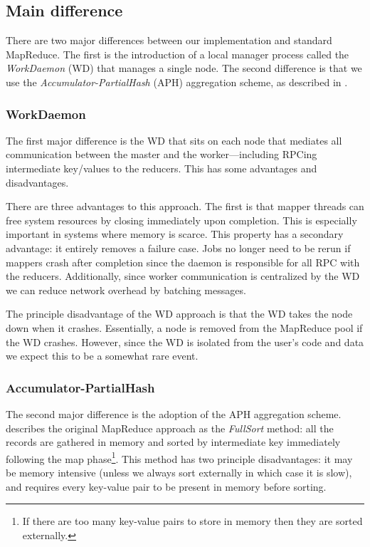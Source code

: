 \documentclass[10pt,letter,final,article,twocolumn]{article} %
\begin{document}
\subsection{Main difference}

There are two major differences between our implementation and standard MapReduce. The first is the introduction of a local manager process called the \emph{WorkDaemon} (WD) that manages a single node. The second difference is that we use the \emph{Accumulator-PartialHash} (APH) aggregation scheme, as described in \citet{yu2009distributed}.

\subsubsection{WorkDaemon}

The first major difference is the WD that sits on each node that mediates all communication between the master and the worker---including RPCing intermediate key/values to the reducers. This has some advantages and disadvantages.

There are three advantages to this approach. The first is that mapper threads can free system resources by closing immediately upon completion. This is especially important in systems where memory is scarce. This property has a secondary advantage: it entirely removes a failure case. Jobs no longer need to be rerun if mappers crash after completion since the daemon is responsible for all RPC with the reducers. Additionally, since worker communication is centralized by the WD we can reduce network overhead by batching messages.

The principle disadvantage of the WD approach is that the WD takes the node down when it crashes.  Essentially, a node is removed from the MapReduce pool if the WD crashes. However, since the WD is isolated from the user's code and data we expect this to be a somewhat rare event.

\subsubsection{Accumulator-PartialHash}

The second major difference is the adoption of the APH aggregation scheme. \citet{yu2009distributed} describes the original MapReduce approach as the \emph{FullSort} method: all the records are gathered in memory and sorted by intermediate key immediately following the map phase\footnote{If there are too many key-value pairs to store in memory then they are sorted externally.}. This method has two principle disadvantages: it may be memory intensive (unless we always sort externally in which case it is slow), and requires every key-value pair to be present in memory before sorting. 
\end{document}
